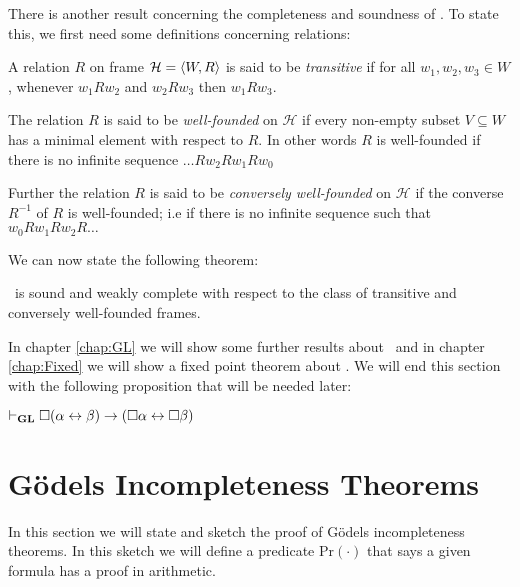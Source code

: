 \documentclass[../main.tex]{subfiles}
\begin{document}
There is another result concerning the completeness and soundness of \GL. To
state this, we first need some definitions concerning relations:
\begin{defi}
	A relation $R$ on frame $\mathcal{H}=\langle W,R\rangle$ is said to be
	\textit{transitive} if for all $w_1,w_2,w_3\in W$, whenever $w_1Rw_2$
	and $w_2Rw_3$ then $w_1Rw_3$.
	
	The relation $R$ is said to be \textit{well-founded} on
	$\mathcal{H}$ if every non-empty  subset $V\subseteq W$ has a minimal
	element with respect to $R$. In other words $R$ is well-founded if
	there is no infinite sequence $\ldots Rw_2Rw_1Rw_0$

	Further the relation $R$ is said to be \textit{conversely well-founded}
	on $\mathcal{H}$ if the converse $R^{-1}$ of $R$ is well-founded; i.e
	if there is no infinite sequence such that $w_0Rw_1Rw_2R\ldots$
\end{defi}
We can now state the following theorem:
\begin{thm}
	\label{thm:GLcomplete}
	\GL\ is sound and weakly complete with respect to the class of
	transitive and conversely well-founded frames.
\end{thm}
In chapter \ref{chap:GL} we will show some further results about \GL\ and in
chapter
\ref{chap:Fixed} we will show a fixed point theorem about \GL.
We will end this section with the following proposition that will be needed
later:
\begin{prop}\label{prop:GL}
	$\vdash_{\text{\textbf{GL}}}\Box(\alpha\leftrightarrow\beta)\rightarrow(\Box\alpha\leftrightarrow\Box\beta)$
\end{prop}

\section{Gödels Incompleteness Theorems}
In this section we will state and sketch the proof of Gödels incompleteness
theorems. In this sketch we will define a predicate $\text{Pr}(\cdot)$ that
says a given formula has a proof in arithmetic.
\end{document}
